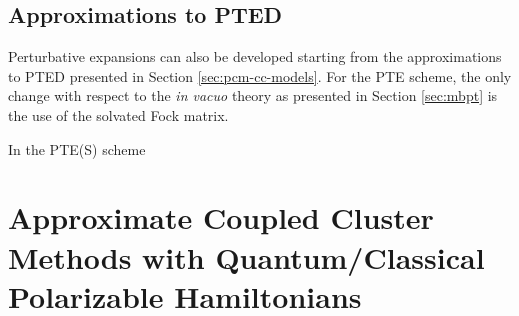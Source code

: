 \subsection{Approximations to PTED}


Perturbative expansions can also be developed starting from the
approximations to \acrshort{PTED} presented in Section
\ref{sec:pcm-cc-models}.
For the \acrshort{PTE} scheme, the only change with respect to the
\emph{in vacuo} theory as presented in Section \ref{sec:mbpt} is the use
of the solvated Fock matrix.\autocite{Olivares_del_Valle1991-of,
Angyan1995-co, Lipparini2009-io}

In the \acrshort{PTE(S)} scheme


\section[Approximate Coupled Cluster Methods]{
Approximate Coupled Cluster Methods with Quantum/Classical Polarizable Hamiltonians
}\label{sec:cc-approximate-quantum-classical}

